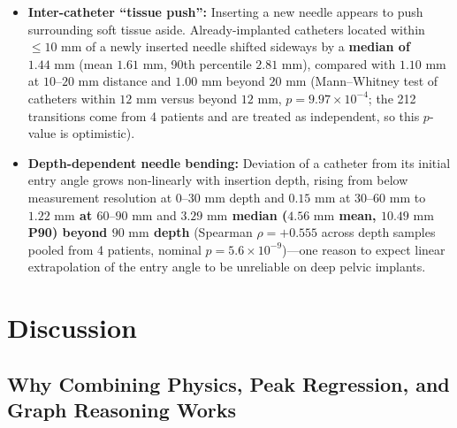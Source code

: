 \documentclass[
  11pt,
]{article}
\providecommand{\tightlist}{%
  \setlength{\itemsep}{0pt}\setlength{\parskip}{0pt}}
\begin{document}
\begin{itemize}
\tightlist
\item
  \textbf{Inter-catheter ``tissue push'':} Inserting a new needle
  appears to push surrounding soft tissue aside. Already-implanted
  catheters located within \(\le 10\text{ mm}\) of a newly inserted
  needle shifted sideways by a \textbf{median of \(1.44\text{ mm}\)}
  (mean \(1.61\text{ mm}\), 90th percentile \(2.81\text{ mm}\)),
  compared with \textbf{\(1.10\text{ mm}\)} at
  \(10\text{--}20\text{ mm}\) distance and \textbf{\(1.00\text{ mm}\)}
  beyond \(20\text{ mm}\) (Mann--Whitney test of catheters within
  \(12\text{ mm}\) versus beyond \(12\text{ mm}\),
  \(p = 9.97 \times 10^{-4}\); the 212 transitions come from 4 patients
  and are treated as independent, so this \(p\)-value is optimistic).
\item
  \textbf{Depth-dependent needle bending:} Deviation of a catheter from
  its initial entry angle grows non-linearly with insertion depth,
  rising from below measurement resolution at \(0\text{--}30\text{ mm}\)
  depth and \(0.15\text{ mm}\) at \(30\text{--}60\text{ mm}\) to
  \textbf{\(1.22\text{ mm}\) at \(60\text{--}90\text{ mm}\)} and
  \textbf{\(3.29\text{ mm}\) median (\(4.56\text{ mm}\) mean,
  \(10.49\text{ mm}\) P90) beyond \(90\text{ mm}\) depth} (Spearman
  \(\rho = +0.555\) across depth samples pooled from 4 patients, nominal
  \(p = 5.6 \times 10^{-9}\))---one reason to expect linear
  extrapolation of the entry angle to be unreliable on deep pelvic
  implants.
\end{itemize}

\FloatBarrier

\section{Discussion}\label{discussion}

\subsection{Why Combining Physics, Peak Regression, and Graph Reasoning
Works}\label{why-combining-physics-peak-regression-and-graph-reasoning-works}
\end{document}
